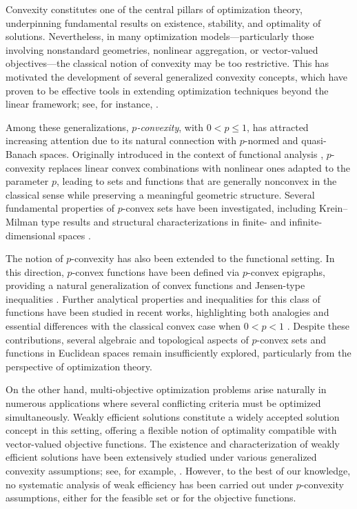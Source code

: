 \documentclass[10pt]{article}
\begin{document}
Convexity constitutes one of the central pillars of optimization theory, underpinning fundamental results on existence, stability, and optimality of solutions. Nevertheless, in many optimization models—particularly those involving nonstandard geometries, nonlinear aggregation, or vector-valued objectives—the classical notion of convexity may be too restrictive. This has motivated the development of several generalized convexity concepts, which have proven to be effective tools in extending optimization techniques beyond the linear framework; see, for instance, \cite{D1,D2}.

Among these generalizations, \emph{$p$-convexity}, with $0<p\leq 1$, has attracted increasing attention due to its natural connection with $p$-normed and quasi-Banach spaces. Originally introduced in the context of functional analysis \cite{A,BF,BP,XZ}, $p$-convexity replaces linear convex combinations with nonlinear ones adapted to the parameter $p$, leading to sets and functions that are generally nonconvex in the classical sense while preserving a meaningful geometric structure. Several fundamental properties of $p$-convex sets have been investigated, including Krein--Milman type results and structural characterizations in finite- and infinite-dimensional spaces \cite{GL,GKR}.

The notion of $p$-convexity has also been extended to the functional setting. In this direction, $p$-convex functions have been defined via $p$-convex epigraphs, providing a natural generalization of convex functions and Jensen-type inequalities \cite{SETA}. Further analytical properties and inequalities for this class of functions have been studied in recent works, highlighting both analogies and essential differences with the classical convex case when $0<p<1$ \cite{KSTA,EKT}. Despite these contributions, several algebraic and topological aspects of $p$-convex sets and functions in Euclidean spaces remain insufficiently explored, particularly from the perspective of optimization theory.

On the other hand, multi-objective optimization problems arise naturally in numerous applications where several conflicting criteria must be optimized simultaneously. Weakly efficient solutions constitute a widely accepted solution concept in this setting, offering a flexible notion of optimality compatible with vector-valued objective functions. The existence and characterization of weakly efficient solutions have been extensively studied under various generalized convexity assumptions; see, for example, \cite{BBP,D1,D2,D3,FV1,FV2,FV4,FHV,FLV}. However, to the best of our knowledge, no systematic analysis of weak efficiency has been carried out under $p$-convexity assumptions, either for the feasible set or for the objective functions.
\end{document}
